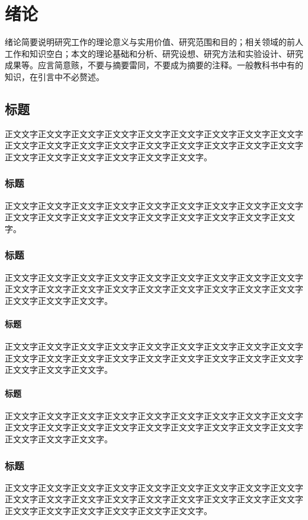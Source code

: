 \chapter{绪论}
绪论简要说明研究工作的理论意义与实用价值、研究范围和目的；相关领域的前人工作和知识空白；本文的理论基础和分析、研究设想、研究方法和实验设计、研究成果等。应言简意赅，不要与摘要雷同，不要成为摘要的注释。一般教科书中有的知识，在引言中不必赘述。

\section{标题}
正文文字正文文字正文文字正文文字正文文字正文文字正文文字正文文字正文文字正文文字正文文字正文文字正文文字正文文字正文文字正文文字正文文字正文文字正文文字正文文字正文文字正文文字正文文字正文文字。

\subsection{标题}
正文文字正文文字正文文字正文文字正文文字正文文字正文文字正文文字正文文字正文文字正文文字正文文字正文文字正文文字正文文字正文文字正文文字正文文字。

\subsection{标题}
正文文字正文文字正文文字正文文字正文文字正文文字正文文字正文文字正文文字正文文字正文文字正文文字正文文字正文文字正文文字正文文字正文文字正文文字正文文字正文文字正文文字。

\subsubsection{标题}
正文文字正文文字正文文字正文文字正文文字正文文字正文文字正文文字正文文字正文文字正文文字正文文字正文文字正文文字正文文字正文文字正文文字正文文字正文文字正文文字正文文字。

\subsubsection{标题}
正文文字正文文字正文文字正文文字正文文字正文文字正文文字正文文字正文文字正文文字正文文字正文文字正文文字正文文字正文文字正文文字正文文字正文文字正文文字正文文字正文文字。

\subsection{标题}
正文文字正文文字正文文字正文文字正文文字正文文字正文文字正文文字正文文字正文文字正文文字正文文字正文文字正文文字正文文字正文文字正文文字正文文字正文文字正文文字正文文字正文文字正文文字正文文字。

